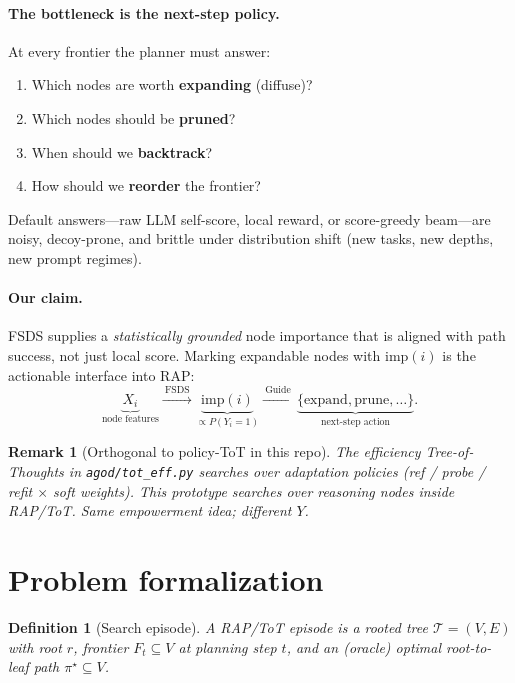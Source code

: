 \documentclass[11pt]{article}
\newtheorem{definition}{Definition}
\newtheorem{remark}{Remark}
\newcommand{\imp}{\mathrm{imp}}
\begin{document}
\paragraph{The bottleneck is the next-step policy.}
At every frontier the planner must answer:
\begin{enumerate}[leftmargin=1.4em,itemsep=0.15em]
  \item Which nodes are worth \textbf{expanding} (diffuse)?
  \item Which nodes should be \textbf{pruned}?
  \item When should we \textbf{backtrack}?
  \item How should we \textbf{reorder} the frontier?
\end{enumerate}
Default answers---raw LLM self-score, local reward, or score-greedy
beam---are noisy, decoy-prone, and brittle under distribution shift
(new tasks, new depths, new prompt regimes).

\paragraph{Our claim.}
FSDS supplies a \emph{statistically grounded} node importance that is
aligned with path success, not just local score. Marking expandable
nodes with $\imp(i)$ is the actionable interface into RAP:
\[
  \underbrace{X_i}_{\text{node features}}
  \xrightarrow{\ \mathrm{FSDS}\ }
  \underbrace{\imp(i)}_{\propto P(Y_i=1)}
  \xrightarrow{\ \mathrm{Guide}\ }
  \underbrace{\{\mathrm{expand},\mathrm{prune},\ldots\}}_{\text{next-step action}}.
\]

\begin{remark}[Orthogonal to policy-ToT in this repo]
The efficiency Tree-of-Thoughts in \texttt{agod/tot\_eff.py} searches over
\emph{adaptation policies} (ref / probe / refit $\times$ soft weights).
This prototype searches over \emph{reasoning nodes} inside RAP/ToT.
Same empowerment idea; different $Y$.
\end{remark}

\section{Problem formalization}
\label{sec:formal}

\begin{definition}[Search episode]
A RAP/ToT episode is a rooted tree $\mathcal{T}=(V,E)$ with root $r$,
frontier $F_t\subseteq V$ at planning step $t$, and an (oracle) optimal
root-to-leaf path $\pi^\star\subseteq V$.
\end{definition}
\end{document}
